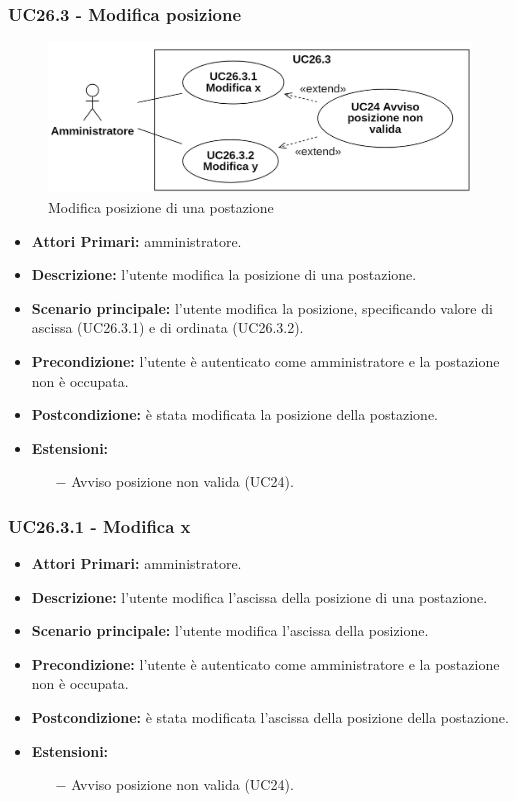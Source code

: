 \subsubsection{ UC26.3 - Modifica posizione}
\begin{figure}[H]
	\centering
	\includegraphics[width=18cm]{res/images/UC26.3.png}
	\caption{Modifica posizione di una postazione}
\end{figure}
\begin{itemize}
	\item\textbf{Attori Primari:}
	amministratore.
	\item\textbf{Descrizione:}
	l'utente modifica la posizione di una postazione.
	\item\textbf{Scenario principale:} 
	l'utente modifica la posizione, specificando valore di ascissa (UC26.3.1) e di ordinata (UC26.3.2).
	\item\textbf{Precondizione:} 
	l'utente è autenticato come amministratore e la postazione non è occupata.
	\item\textbf{Postcondizione:}
	è stata modificata la posizione della postazione.
	\item\textbf{Estensioni:}
	\begin{itemize}
		\item[$-$] Avviso posizione non valida (UC24).
	\end{itemize}
\end{itemize}

\subsubsection{ UC26.3.1 - Modifica x}
\begin{itemize}
	\item\textbf{Attori Primari:}
	amministratore.
	\item\textbf{Descrizione:}
	l'utente modifica l'ascissa della posizione di una postazione.
	\item\textbf{Scenario principale:} 
	l'utente modifica l'ascissa della posizione.
	\item\textbf{Precondizione:} 
	l'utente è autenticato come amministratore e la postazione non è occupata.
	\item\textbf{Postcondizione:}
	è stata modificata l'ascissa della posizione della postazione.
	\item\textbf{Estensioni:}
	\begin{itemize}
		\item[$-$] Avviso posizione non valida (UC24).
	\end{itemize}
\end{itemize}

